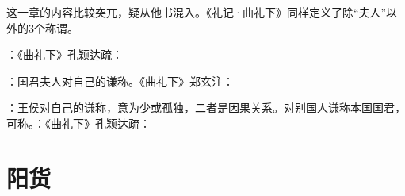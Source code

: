 {
这一章的内容比较突兀，疑从他书混入。《礼记·曲礼下》同样定义了除“夫人”以外的3个称谓。
\begin{lyblobitemize}
\item {}：《曲礼下》孔颖达疏：
\item {}：国君夫人对自己的谦称。《曲礼下》郑玄注：
\item {}：王侯对自己的谦称，意为少或孤独，二者是因果关系。对别国人谦称本国国君，可称。：《曲礼下》孔颖达疏：
\end{lyblobitemize}
}
{}


\chapter{阳货}

